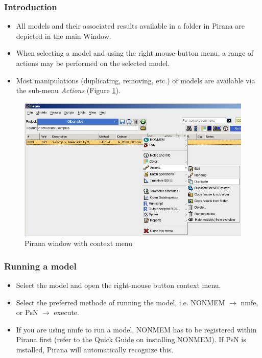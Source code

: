 
\subsubsection*{Introduction}
\begin{itemize}
\item All models and their associated results available in a folder in
  Pirana are depicted in the main Window.
\item When selecting a model and using the right mouse-button menu, a
  range of actions may be performed on the selected model.
\item Most manipulations (duplicating, removing, etc.) of models are
  available via the sub-menu \emph{Actions} (Figure \ref{fig:Fig1}).
\end{itemize}

\begin{figure}[h] \centering
    \includegraphics[scale=.4]{images/working_3.jpg}
    \caption{Pirana window with context menu\label{fig:Fig1}}
\end{figure}


\subsubsection*{Running a model}
\begin{itemize}
\item Select the model and open the right-mouse button context menu.
\item Select the preferred methode of running the model, i.e. NONMEM $
  \rightarrow$ nmfe, or PsN $ \rightarrow$ execute. 
\item If you are using nmfe to run a model, NONMEM has to be
  registered within Pirana first (refer to the Quick Guide on
  installing NONMEM). If PsN is installed, Pirana will automatically
  recognize this.
\end{itemize}

